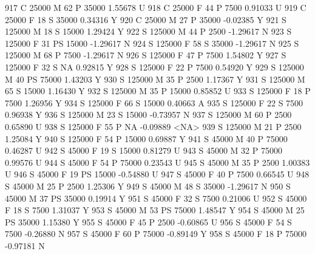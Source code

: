 \documentclass{article}
\begin{document}
\begin{Schunk}
\begin{Soutput}
917       C      25000   M  62         P  35000   1.55678    U
918       C      25000   F  44         P   7500   0.91033    U
919       C      25000   F  18         S  35000   0.34316    Y
920       C      25000   M  27         P  35000  -0.02385    Y
921       S     125000   M  18         S  15000   1.29424    Y
922       S     125000   M  44         P   2500  -1.29617    N
923       S     125000   F  31        PS  15000  -1.29617    N
924       S     125000   F  58         S  35000  -1.29617    N
925       S     125000   M  68         P   7500  -1.29617    N
926       S     125000   F  47         P   7500   1.54802    Y
927       S     125000   F  32         S     NA   0.92815    Y
928       S     125000   F  22         P   7500   0.54920    Y
929       S     125000   M  40        PS  75000   1.43203    Y
930       S     125000   M  35         P   2500   1.17367    Y
931       S     125000   M  65         S  15000   1.16430    Y
932       S     125000   M  35         P  15000   0.85852    U
933       S     125000   F  18         P   7500   1.26956    Y
934       S     125000   F  66         S  15000   0.40663    A
935       S     125000   F  22         S   7500   0.96938    Y
936       S     125000   M  23         S  15000  -0.73957    N
937       S     125000   M  60         P   2500   0.65890    U
938       S     125000   F  55         P     NA  -0.09889 <NA>
939       S     125000   M  21         P   2500   1.25084    Y
940       S     125000   F  54         P  15000   0.69887    Y
941       S      45000   M  40         P  75000   0.46287    U
942       S      45000   F  19         S  15000   0.81279    U
943       S      45000   M  32         P  75000   0.99576    U
944       S      45000   F  54         P  75000   0.23543    U
945       S      45000   M  35         P   2500   1.00383    U
946       S      45000   F  19        PS  15000  -0.54880    U
947       S      45000   F  40         P   7500   0.66545    U
948       S      45000   M  25         P   2500   1.25306    Y
949       S      45000   M  48         S  35000  -1.29617    N
950       S      45000   M  37        PS  35000   0.19914    Y
951       S      45000   F  32         S   7500   0.21006    U
952       S      45000   F  18         S   7500   1.31037    Y
953       S      45000   M  53        PS  75000   1.48547    Y
954       S      45000   M  25        PS  35000   1.15380    Y
955       S      45000   F  45         P   2500  -0.60865    U
956       S      45000   F  54         S   7500  -0.26880    N
957       S      45000   F  60         P  75000  -0.89149    Y
958       S      45000   F  18         P  75000  -0.97181    N

\end{Soutput}
\end{Schunk}
\end{document}
